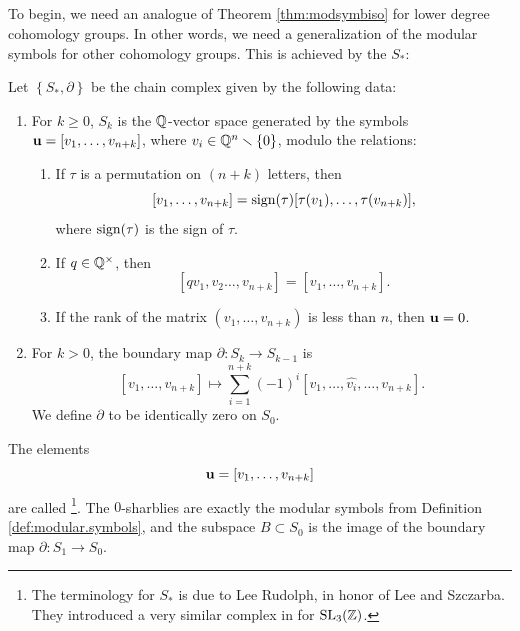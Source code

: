 \subsection{}\label{sharbly.sect}
%
To begin, we need an analogue of Theorem \ref{thm:modsymbiso} for
lower degree cohomology groups.  In other words, we need a
generalization of the modular symbols for other cohomology groups.
This is achieved by the  $S_{*}$:

\begin{definition} \label{sharbly.complex}
 Let 
$\left\{S_{*},\partial \right\}$ be the chain complex given by the following data:
\begin{enumerate}
\item For $k\geq 0$, $S_{k}$ is the $\mathbb{Q}$-vector space generated
by the symbols ${\mathbf {u}}  = [v_{1},\ldots,v_{n+k}]$, where $v_{i}\in
\mathbb{Q}^{n}\smallsetminus \{0 \}$, modulo the relations:
\begin{enumerate}
\item If $\tau $ is a permutation on $(n+k)$ letters, then
\[
[v_{1},\ldots,v_{n+k}] = \operatorname{sign} (\tau ) [\tau (v_{1}),\ldots,\tau
(v_{n+k})], 
\]
where $\operatorname{sign} (\tau )$ is the sign of $\tau $.
\item  If $q \in \mathbb{Q}^{\times }$, then 
\[
[q v_{1},v_{2}\ldots,v_{n+k}] = [v_{1},\ldots,v_{n+k}].
\]
\item If the rank of the matrix
$(v_{1},\ldots,v_{n+k})$ is less than $n$, then ${\mathbf {u}} = 0$.
\end{enumerate}
\item For $k>0$, the boundary map $\partial \colon S_{k}\rightarrow S_{k-1}$ is 
$$[v_{1},\ldots,v_{n+k}] \longmapsto \sum _{i=1}^{n+k}  (-1)^{i}
[v_{1},\ldots,\hat{v_{i}},\ldots,v_{n+k}].  $$
We define $\partial$ to be identically zero on $S_{0}$.
\end{enumerate}
\end{definition}

The elements $${\mathbf {u}} = [v_{1},\dots ,v_{n+k}]$$ are called
\footnote{The terminology for $S_{*}$ is due to
Lee Rudolph, in honor of Lee and Szczarba.  They introduced a very
similar complex in \cite{l.s} for $\operatorname{SL}_{3} (\mathbb{Z})$.}.  The $0$-sharblies
are exactly the modular symbols from Definition
\ref{def:modular.symbols}, and the subspace $B\subset S_{0}$ is the
image of the boundary map $\partial \colon S_{1}\rightarrow S_{0}$.

